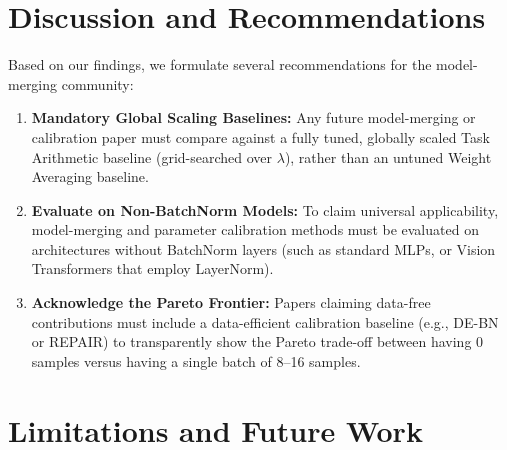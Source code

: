 \documentclass{article}
\begin{document}
\section{Discussion and Recommendations}
\label{sec:discussion}

Based on our findings, we formulate several recommendations for the model-merging community:
\begin{enumerate}
    \item \textbf{Mandatory Global Scaling Baselines:} Any future model-merging or calibration paper must compare against a fully tuned, globally scaled Task Arithmetic baseline (grid-searched over $\lambda$), rather than an untuned Weight Averaging baseline.
    \item \textbf{Evaluate on Non-BatchNorm Models:} To claim universal applicability, model-merging and parameter calibration methods must be evaluated on architectures without BatchNorm layers (such as standard MLPs, or Vision Transformers that employ LayerNorm).
    \item \textbf{Acknowledge the Pareto Frontier:} Papers claiming data-free contributions must include a data-efficient calibration baseline (e.g., DE-BN or REPAIR) to transparently show the Pareto trade-off between having 0 samples versus having a single batch of 8–16 samples.
\end{enumerate}

\section{Limitations and Future Work}
\label{sec:limitations}
\end{document}
